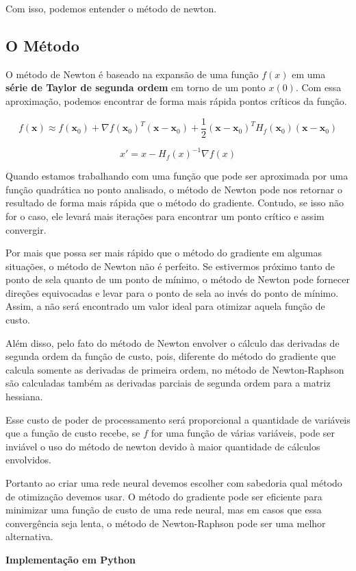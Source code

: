Com isso, podemos entender o método de newton.

\subsection{O Método}

O método de Newton é baseado na expansão de uma função $f(x)$ em uma \textbf{série de Taylor de segunda ordem} em torno de um ponto $x(0)$. Com essa aproximação, podemos encontrar de forma mais rápida pontos críticos da função.

    \begin{equation}
         f(\mathbf{x}) \approx f(\mathbf{x}_0) + \nabla f(\mathbf{x}_0)^T (\mathbf{x} - \mathbf{x}_0) + \frac{1}{2} (\mathbf{x} - \mathbf{x}_0)^T H_f(\mathbf{x}_0) (\mathbf{x} - \mathbf{x}_0)
    \end{equation}

    \begin{equation}
         x' = x - H_f(x)^{-1} \nabla f(x)
    \end{equation}

Quando estamos trabalhando com uma função que pode ser aproximada por uma função quadrática no ponto analisado, o método de Newton pode nos retornar o resultado de forma mais rápida que o método do gradiente. Contudo, se isso não for o caso, ele levará mais iterações para encontrar um ponto crítico e assim convergir.

Por mais que possa ser mais rápido que o método do gradiente em algumas situações, o método de Newton não é perfeito. Se estivermos próximo tanto de ponto de sela quanto de um ponto de mínimo, o método de Newton pode fornecer direções equivocadas e levar para o ponto de sela ao invés do ponto de mínimo. Assim, a não será encontrado um valor ideal para otimizar aquela função de custo.

Além disso, pelo fato do método de Newton envolver o cálculo das derivadas de segunda ordem da função de custo, pois, diferente do método do gradiente que calcula somente as derivadas de primeira ordem, no método de Newton-Raphson são calculadas também as derivadas parciais de segunda ordem para a matriz hessiana.

 Esse custo de poder de processamento será proporcional a quantidade de variáveis que a função de custo recebe, se $f$ for uma função de várias variáveis, pode ser inviável o uso do método de newton devido à maior quantidade de cálculos envolvidos.

Portanto ao criar uma rede neural devemos escolher com sabedoria qual método de otimização devemos usar. O método do gradiente pode ser eficiente para minimizar uma função de custo de uma rede neural, mas em casos que essa convergência seja lenta, o método de Newton-Raphson pode ser uma melhor alternativa.

\textbf{Implementação em Python}

